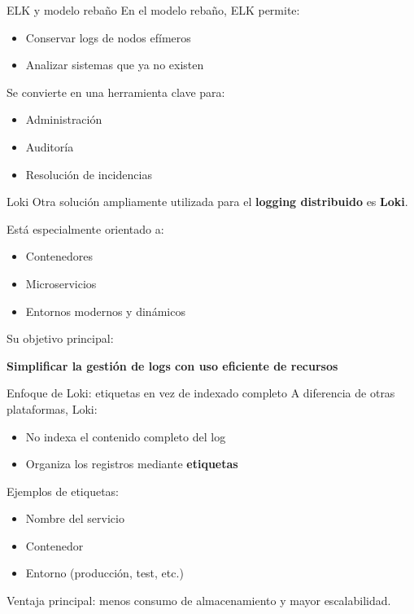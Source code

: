 \documentclass{beamer}
\begin{document}
\begin{frame}{ELK y modelo rebaño}
En el modelo rebaño, ELK permite:
\begin{itemize}
    \item Conservar logs de nodos efímeros
    \item Analizar sistemas que ya no existen
\end{itemize}

\vspace{0.3cm}
Se convierte en una herramienta clave para:
\begin{itemize}
    \item Administración
    \item Auditoría
    \item Resolución de incidencias
\end{itemize}
\end{frame}


\begin{frame}{Loki}
Otra solución ampliamente utilizada para el \textbf{logging distribuido} es \textbf{Loki}.

\vspace{0.3cm}
Está especialmente orientado a:
\begin{itemize}
    \item Contenedores
    \item Microservicios
    \item Entornos modernos y dinámicos
\end{itemize}

\vspace{0.3cm}
Su objetivo principal:
\begin{center}
\textbf{Simplificar la gestión de logs con uso eficiente de recursos}
\end{center}
\end{frame}

\begin{frame}{Enfoque de Loki: etiquetas en vez de indexado completo}
A diferencia de otras plataformas, Loki:
\begin{itemize}
    \item No indexa el contenido completo del log
    \item Organiza los registros mediante \textbf{etiquetas}
\end{itemize}

\vspace{0.3cm}
Ejemplos de etiquetas:
\begin{itemize}
    \item Nombre del servicio
    \item Contenedor
    \item Entorno (producción, test, etc.)
\end{itemize}

\vspace{0.3cm}
Ventaja principal: menos consumo de almacenamiento y mayor escalabilidad.
\end{frame}
\end{document}

